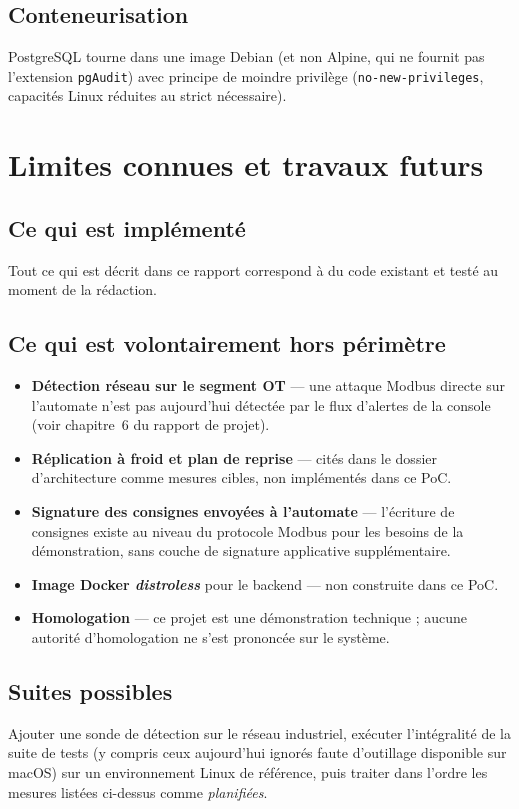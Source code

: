 \documentclass[11pt,a4paper]{report}
\begin{document}
\section{Conteneurisation}
PostgreSQL tourne dans une image Debian (et non Alpine, qui ne fournit pas
l'extension \texttt{pgAudit}) avec principe de moindre privilège
(\texttt{no-new-privileges}, capacités Linux réduites au strict nécessaire).

\chapter{Limites connues et travaux futurs}

\section{Ce qui est implémenté}
Tout ce qui est décrit dans ce rapport correspond à du code existant et
testé au moment de la rédaction.

\section{Ce qui est volontairement hors périmètre}
\begin{itemize}
  \item \textbf{Détection réseau sur le segment OT} --- une attaque Modbus
    directe sur l'automate n'est pas aujourd'hui détectée par le flux
    d'alertes de la console (voir chapitre~6 du rapport de projet).
  \item \textbf{Réplication à froid et plan de reprise} --- cités dans le
    dossier d'architecture comme mesures cibles, non implémentés dans ce
    PoC.
  \item \textbf{Signature des consignes envoyées à l'automate} --- l'écriture
    de consignes existe au niveau du protocole Modbus pour les besoins de la
    démonstration, sans couche de signature applicative supplémentaire.
  \item \textbf{Image Docker \emph{distroless}} pour le backend --- non
    construite dans ce PoC.
  \item \textbf{Homologation} --- ce projet est une démonstration technique ;
    aucune autorité d'homologation ne s'est prononcée sur le système.
\end{itemize}

\section{Suites possibles}
Ajouter une sonde de détection sur le réseau industriel, exécuter
l'intégralité de la suite de tests (y compris ceux aujourd'hui ignorés faute
d'outillage disponible sur macOS) sur un environnement Linux de référence,
puis traiter dans l'ordre les mesures listées ci-dessus comme
\emph{planifiées}.
\end{document}
